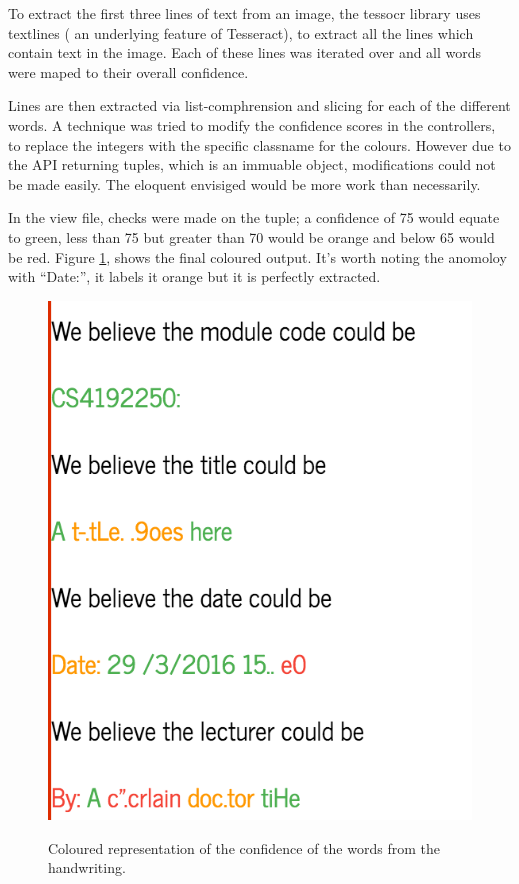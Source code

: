 {{{{{{To extract the first three lines of text from an image, the tessocr library uses textlines ( an underlying feature of Tesseract), to extract all the lines which contain text in the image. Each of these lines was iterated over and all words were maped to their overall confidence.

Lines are then extracted via list-comphrension and slicing for each of the different words. A technique was tried to modify the confidence scores in the controllers, to replace the integers with the specific classname for the colours. However due to the API returning tuples, which is an immuable object, modifications could not be made easily. The eloquent envisiged would be more work than necessarily.

In the view file, checks were made on the tuple; a confidence of 75 would equate to green, less than 75 but greater than 70 would be orange and below 65 would be red. Figure \ref{fig:tesseract_colour}, shows the final coloured output. It's worth noting the anomoloy with ``Date:'', it labels it orange but it is perfectly extracted.
\begin{figure}[H]
  \centering
  \includegraphics{images/tesseract_colour}
  \label{fig:tesseract_colour}
  \caption{Coloured representation of the confidence of the words from the handwriting.}
\end{figure}

}}}}}}
